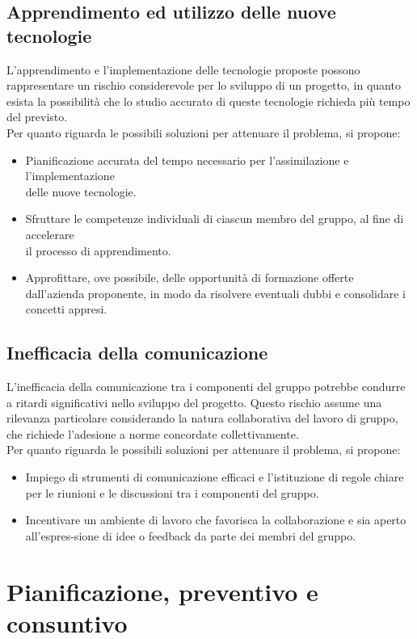 \documentclass{article}
\begin{document}
\subsection{Apprendimento ed utilizzo delle nuove tecnologie} \label{sec:rischioTec}
L’apprendimento e l'implementazione delle tecnologie proposte possono rappresentare un rischio considerevole per lo
sviluppo di un progetto, in quanto esista la possibilità che lo studio accurato di queste tecnologie richieda più tempo del previsto. \\
Per quanto riguarda le possibili soluzioni per attenuare il problema, si propone:
\begin{itemize}
    \item Pianificazione accurata del tempo necessario per l’assimilazione e l’implementazione \\delle nuove tecnologie.
    \item Sfruttare le competenze individuali di ciascun membro del gruppo, al fine di accelerare \\ il processo di apprendimento.
    \item Approfittare, ove possibile, delle opportunità di formazione offerte dall’azienda proponente, in modo da risolvere eventuali dubbi e consolidare i concetti appresi.
\end{itemize}
\subsection{Inefficacia della comunicazione}
L’inefficacia della comunicazione tra i componenti del gruppo potrebbe condurre a ritardi significativi nello sviluppo del progetto. Questo rischio assume una rilevanza particolare considerando la natura collaborativa del lavoro di gruppo, che richiede l’adesione a norme concordate collettivamente.
\\Per quanto riguarda le possibili soluzioni per attenuare il problema, si propone:
\begin{itemize}
    \item Impiego di strumenti di comunicazione efficaci e l’istituzione di regole chiare per le riunioni e le discussioni tra i componenti del gruppo.
    \item Incentivare un ambiente di lavoro che favorisca la collaborazione e sia aperto all'espres-sione di idee o feedback da parte dei membri del gruppo.
\end{itemize}


\section{Pianificazione, preventivo e consuntivo}
\end{document}

